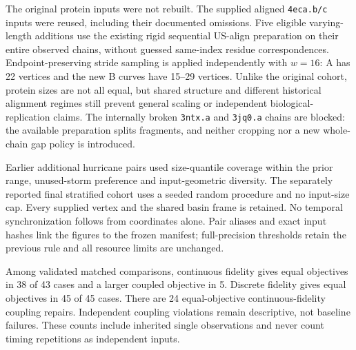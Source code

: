 The original protein inputs were not rebuilt. The supplied aligned \texttt{4eca.b/c} inputs were reused, including their documented omissions. Five eligible varying-length additions use the existing rigid sequential US-align preparation on their entire observed chains, without guessed same-index residue correspondences. Endpoint-preserving stride sampling is applied independently with $w=16$: A has 22 vertices and the new B curves have 15--29 vertices. Unlike the original cohort, protein sizes are not all equal, but shared structure and different historical alignment regimes still prevent general scaling or independent biological-replication claims. The internally broken \texttt{3ntx.a} and \texttt{3jq0.a} chains are blocked: the available preparation splits fragments, and neither cropping nor a new whole-chain gap policy is introduced.

Earlier additional hurricane pairs used size-quantile coverage within the prior range, unused-storm preference and input-geometric diversity. The separately reported final stratified cohort uses a seeded random procedure and no input-size cap. Every supplied vertex and the shared basin frame is retained. No temporal synchronization follows from coordinates alone. Pair aliases and exact input hashes link the figures to the frozen manifest; full-precision thresholds retain the previous rule and all resource limits are unchanged.

Among validated matched comparisons, continuous fidelity gives equal objectives in 38 of 43 cases and a larger coupled objective in 5. Discrete fidelity gives equal objectives in 45 of 45 cases. There are 24 equal-objective continuous-fidelity coupling repairs. Independent coupling violations remain descriptive, not baseline failures. These counts include inherited single observations and never count timing repetitions as independent inputs.

